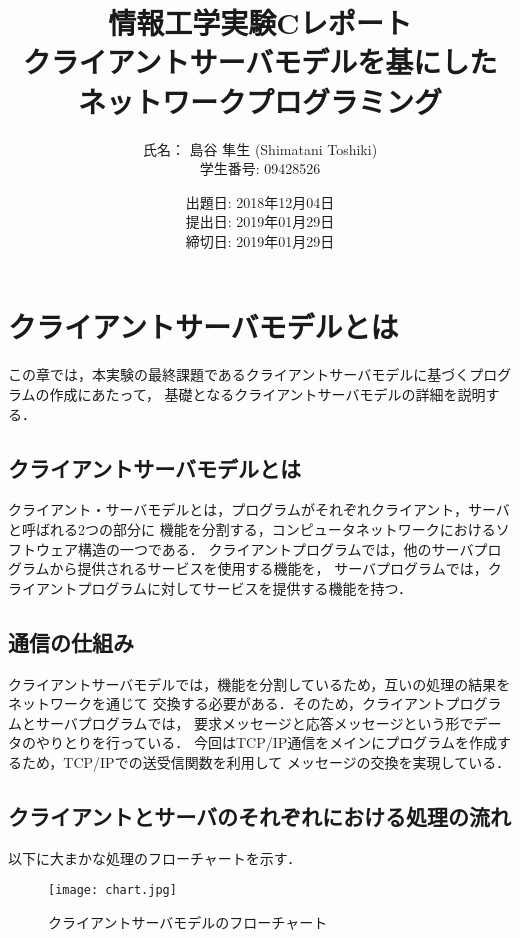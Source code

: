 \documentclass[a4paper,11pt]{jarticle}
\title{情報工学実験Cレポート \\
       クライアントサーバモデルを基にした\\ネットワークプログラミング}
\author{氏名： 島谷 隼生 (Shimatani Toshiki) \\
        学生番号: 09428526}
\date{出題日: 2018年12月04日 \\
      提出日: 2019年01月29日 \\
      締切日: 2019年01月29日 \\}
\begin{document}
\maketitle


\section{クライアントサーバモデルとは}
この章では，本実験の最終課題であるクライアントサーバモデルに基づくプログラムの作成にあたって，
基礎となるクライアントサーバモデルの詳細を説明する．

\subsection{クライアントサーバモデルとは}
クライアント・サーバモデルとは，プログラムがそれぞれクライアント，サーバと呼ばれる2つの部分に
機能を分割する，コンピュータネットワークにおけるソフトウェア構造の一つである．
クライアントプログラムでは，他のサーバプログラムから提供されるサービスを使用する機能を，
サーバプログラムでは，クライアントプログラムに対してサービスを提供する機能を持つ．
\subsection{通信の仕組み}
クライアントサーバモデルでは，機能を分割しているため，互いの処理の結果をネットワークを通じて
交換する必要がある．そのため，クライアントプログラムとサーバプログラムでは，
要求メッセージと応答メッセージという形でデータのやりとりを行っている．
今回はTCP/IP通信をメインにプログラムを作成するため，TCP/IPでの送受信関数を利用して
メッセージの交換を実現している．
\subsection{クライアントとサーバのそれぞれにおける処理の流れ}
以下に大まかな処理のフローチャートを示す．
\begin{figure}[htbp]
\begin{center}
\caption{クライアントサーバモデルのフローチャート}
\texttt{[image: chart.jpg]}

\end{center}
\end{figure}
\end{document}
